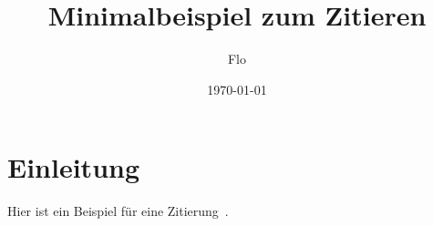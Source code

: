 \documentclass{article}
\begin{document}
\title{Minimalbeispiel zum Zitieren}
\author{Flo}
\date{\today}
\maketitle

\section{Einleitung}
Hier ist ein Beispiel für eine Zitierung~\cite{Aaij.2015}.

\printbibliography
\end{document}
